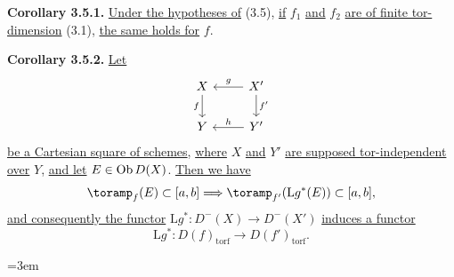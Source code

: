 \textbf{Corollary 3.5.1.} \uline{Under the hypotheses of} (3.5), \uline{if} \(f_1\) \uline{and} \(f_2\) \uline{are of finite tor-dimension} (3.1), \uline{the same holds for} \(f\).

\textbf{Corollary 3.5.2.} \uline{Let}
\[
\begin{tikzcd}
X \arrow[d,"f"'] & X' \arrow[l,"g"'] \arrow[d,"f'"]\\
Y & Y' \arrow[l,"h"']
\end{tikzcd}
\]
\uline{be a Cartesian square of schemes}, \uline{where} \(X\) \uline{and} \(Y'\) \uline{are supposed tor-independent over} \(Y\), \uline{and let} \(E\in\Ob D(X)\). \uline{Then we have}
\[
  \toramp_f(E)\subset[a,b]\Longrightarrow
  \toramp_{f'}(\mathrm Lg^*(E))\subset[a,b],
\]
\uline{and consequently the functor} \(\mathrm Lg^*:D^{-}(X)\to D^{-}(X')\) \uline{induces a functor}
\[
  \mathrm Lg^*:D(f)_{\mathrm{torf}}\longrightarrow D(f')_{\mathrm{torf}} .
\]


\providecommand{\Ob}{\operatorname{Ob}}
\providecommand{\D}{\mathrm D}
\providecommand{\Ho}{\mathrm H}
\providecommand{\RHom}{\mathrm R\!\operatorname{Hom}}
\providecommand{\parfamp}{\operatorname{parf.amp}}
\providecommand{\tamp}{\operatorname{tor.amp}}
\providecommand{\Qcoh}{\operatorname{Qcoh}}
\providecommand{\Mod}{\operatorname{Mod}}
\providecommand{\Coh}{\operatorname{Coh}}
\providecommand{\Lib}{\operatorname{Lib}}
\providecommand{\Loclib}{\operatorname{Loclib}}
\providecommand{\qcoh}{\mathrm{qcoh}}
\providecommand{\coh}{\mathrm{coh}}
\providecommand{\parf}{\mathrm{parf}}
\providecommand{\torf}{\mathrm{torf}}
\providecommand{\id}{\operatorname{id}}
\providecommand{\Coker}{\operatorname{Coker}}
\providecommand{\rank}{\operatorname{rank}}
\providecommand{\rg}{\operatorname{rg}}
\providecommand{\Hom}{\operatorname{Hom}}
\providecommand{\Ext}{\operatorname{Ext}}
\providecommand{\Spec}{\operatorname{Spec}}
\providecommand{\Cone}{\operatorname{Cone}}
\providecommand{\pt}{\operatorname{Pt}}
\providecommand{\ind}{\operatorname{ind}}
\hfuzz=20pt
\emergencystretch=3em

